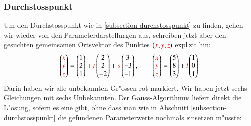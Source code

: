 \subsubsection{Durchstosspunkt}
Um den Durchstosspunkt wie in \ref{subsection-durchstosspunkt} zu finden,
gehen wir wieder von den Parameterdarstellungen aus, schreiben jetzt
aber den gesuchten gemeinsamen Ortsvektor des Punktes
$({\color{red}x}, {\color{red}y}, {\color{red}z})$ explizit hin:
\[
\begin{pmatrix}
\color{red}x\\
\color{red}y\\
\color{red}z\\
\end{pmatrix}
=
\begin{pmatrix}1\\2\\1 \end{pmatrix}
+
{\color{red}t}\begin{pmatrix}2\\2\\-2\end{pmatrix}
+
{\color{red}s}\begin{pmatrix}3\\-3\\-1\end{pmatrix}
,\qquad
\begin{pmatrix}
\color{red}x\\
\color{red}y\\
\color{red}z\\
\end{pmatrix}
=
\begin{pmatrix} 5\\8\\3 \end{pmatrix}
+
{\color{red}l}\begin{pmatrix} 1\\0\\1 \end{pmatrix}
\]
Darin haben wir alle unbekannten Gr"ossen {\color{red}rot} markiert.
Wir haben jetzt sechs Gleichungen mit sechs Unbekannten.
Der Gauss-Algorithmus liefert direkt die L"osung, sofern es eine gibt,
ohne dass man wie in Abschnitt \ref{subsection-durchstosspunkt} 
die gefundenen Parameterwerte nochmals einsetzen m"usste:
